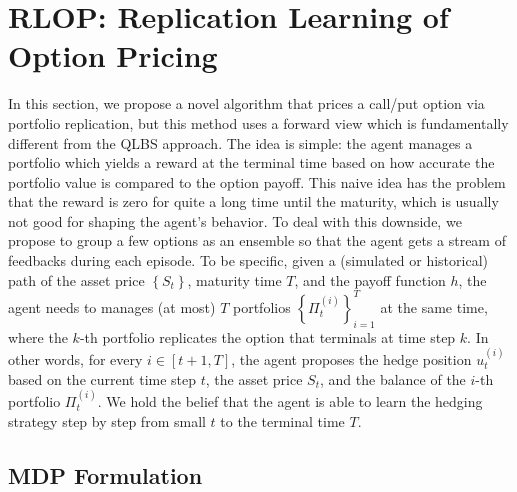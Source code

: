 
\section{RLOP: Replication Learning of Option Pricing}

In this section, we propose a novel algorithm that prices a call/put
option via portfolio replication, but this method uses a forward view
which is fundamentally different from the QLBS approach. The idea
is simple: the agent manages a portfolio which yields a reward at
the terminal time based on how accurate the portfolio value is compared
to the option payoff. This naive idea has the problem that the reward
is zero for quite a long time until the maturity, which is usually
not good for shaping the agent's behavior. To deal with this downside,
we propose to group a few options as an ensemble so that the agent
gets a stream of feedbacks during each episode. To be specific, given
a (simulated or historical) path of the asset price $\left\{ S_{t}\right\} $,
maturity time $T$, and the payoff function $h$, the agent needs
to manages (at most) $T$ portfolios $\left\{ \Pi_{t}^{\left(i\right)}\right\} _{i=1}^{T}$
at the same time, where the $k$-th portfolio replicates the option
that terminals at time step $k$. In other words, for every $i\in\left[t+1,T\right]$,
the agent proposes the hedge position $u_{t}^{\left(i\right)}$ based
on the current time step $t$, the asset price $S_{t}$, and the balance
of the $i$-th portfolio $\Pi_{t}^{\left(i\right)}$. We hold the
belief that the agent is able to learn the hedging strategy step by
step from small $t$ to the terminal time $T$.

\subsection{MDP Formulation}

